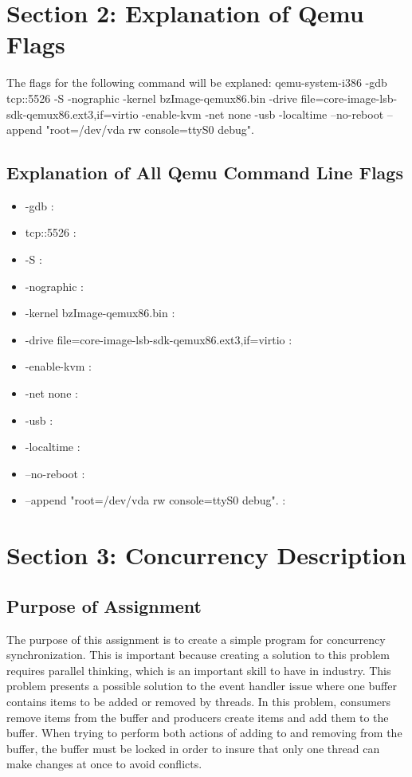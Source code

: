 \documentclass[letterpaper,10pt]{article}
\begin{document}
\section{Section 2: Explanation of Qemu Flags}
The flags for the following command will be explaned: \newline
qemu-system-i386 -gdb tcp::5526 -S -nographic -kernel bzImage-qemux86.bin -drive
file=core-image-lsb-sdk-qemux86.ext3,if=virtio -enable-kvm -net none -usb
-localtime --no-reboot --append "root=/dev/vda rw console=ttyS0 debug".\newline

\subsection{Explanation of All Qemu Command Line Flags}
\begin{itemize}
\item -gdb : 
\item tcp::5526 :
\item -S :
\item -nographic :
\item -kernel bzImage-qemux86.bin :
\item -drive file=core-image-lsb-sdk-qemux86.ext3,if=virtio :
\item -enable-kvm :
\item -net none :
\item -usb :
\item -localtime :
\item --no-reboot :
\item --append "root=/dev/vda rw console=ttyS0 debug". :
\end{itemize}

\section{Section 3: Concurrency Description}
\subsection{Purpose of Assignment}
The purpose of this assignment is to create a simple program for concurrency
synchronization. This is important because creating a solution to this problem
requires parallel thinking, which is an important skill to have in industry.
This problem presents a possible solution to the event handler issue where one
buffer contains items to be added or removed by threads. In this problem,
consumers remove items from the buffer and producers create items and add them
to the buffer. When trying to perform both actions of adding to and removing
from the buffer, the buffer must be locked in order to insure that only one
thread can make changes at once to avoid conflicts.
\end{document}
